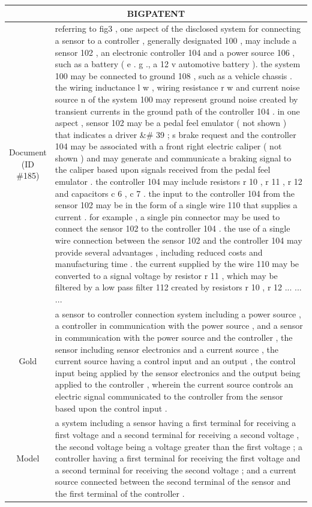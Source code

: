 \begin{table}[bth!]
\scriptsize
\centering
\renewcommand{\arraystretch}{1.3}
\begin{tabular}{c|p{}}
\hline
\multicolumn{2}{c}{BIGPATENT} \\ \hline
\makecell{Document\\(ID \#185)} & 
referring to fig3 , one aspect of the disclosed system for connecting a sensor to a controller , generally designated 100 , may include a sensor 102 , an electronic controller 104 and a power source 106 , such as a battery ( e . g ., a 12 v automotive battery ). the system 100 may be connected to ground 108 , such as a vehicle chassis . the wiring inductance l w , wiring resistance r w and current noise source n of the system 100 may represent ground noise created by transient currents in the ground path of the controller 104 . in one aspect , sensor 102 may be a pedal feel emulator ( not shown ) that indicates a driver \&\# 39 ; s brake request and the controller 104 may be associated with a front right electric caliper ( not shown ) and may generate and communicate a braking signal to the caliper based upon signals received from the pedal feel emulator . the controller 104 may include resistors r 10 , r 11 , r 12 and capacitors c 6 , c 7 . the input to the controller 104 from the sensor 102 may be in the form of a single wire 110 that supplies a current . for example , a single pin connector may be used to connect the sensor 102 to the controller 104 . the use of a single wire connection between the sensor 102 and the controller 104 may provide several advantages , including reduced costs and manufacturing time . the current supplied by the wire 110 may be converted to a signal voltage by resistor r 11 , which may be filtered by a low pass filter 112 created by resistors r 10 , r 12 ... ... ... 
\\ \hline
Gold & 
a sensor to controller connection system including a power source , a controller in communication with the power source , and a sensor in communication with the power source and the controller , the sensor including sensor electronics and a current source , the current source having a control input and an output , the control input being applied by the sensor electronics and the output being applied to the controller , wherein the current source controls an electric signal communicated to the controller from the sensor based upon the control input .
\\ \hline
Model & 
a system including a sensor having a first terminal for receiving a first voltage and a second terminal for receiving a second voltage , the second voltage being a voltage greater than the first voltage ; a controller having a first terminal for receiving the first voltage and a second terminal for receiving the second voltage ; and a current source connected between the second terminal of the sensor and the first terminal of the controller .

\end{tabular}
\end{table}
